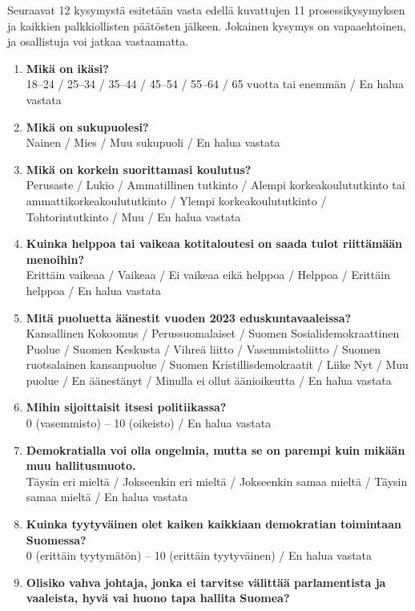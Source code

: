 Seuraavat 12 kysymystä esitetään vasta edellä kuvattujen 11 prosessikysymyksen ja kaikkien palkkiollisten päätösten jälkeen. Jokainen kysymys on vapaaehtoinen, ja osallistuja voi jatkaa vastaamatta.
\begin{enumerate}
  \item \textbf{Mikä on ikäsi?}\\
  18--24 / 25--34 / 35--44 / 45--54 / 55--64 / 65 vuotta tai enemmän / En halua vastata
  \item \textbf{Mikä on sukupuolesi?}\\
  Nainen / Mies / Muu sukupuoli / En halua vastata
  \item \textbf{Mikä on korkein suorittamasi koulutus?}\\
  Perusaste / Lukio / Ammatillinen tutkinto / Alempi korkeakoulututkinto tai ammattikorkeakoulututkinto / Ylempi korkeakoulututkinto / Tohtorintutkinto / Muu / En halua vastata
  \item \textbf{Kuinka helppoa tai vaikeaa kotitaloutesi on saada tulot riittämään menoihin?}\\
  Erittäin vaikeaa / Vaikeaa / Ei vaikeaa eikä helppoa / Helppoa / Erittäin helppoa / En halua vastata
  \item \textbf{Mitä puoluetta äänestit vuoden 2023 eduskuntavaaleissa?}\\
  Kansallinen Kokoomus / Perussuomalaiset / Suomen Sosialidemokraattinen Puolue / Suomen Keskusta / Vihreä liitto / Vasemmistoliitto / Suomen ruotsalainen kansanpuolue / Suomen Kristillisdemokraatit / Liike Nyt / Muu puolue / En äänestänyt / Minulla ei ollut äänioikeutta / En halua vastata
  \item \textbf{Mihin sijoittaisit itsesi politiikassa?}\\
  0 (vasemmisto) -- 10 (oikeisto) / En halua vastata
  \item \textbf{Demokratialla voi olla ongelmia, mutta se on parempi kuin mikään muu hallitusmuoto.}\\
  Täysin eri mieltä / Jokseenkin eri mieltä / Jokseenkin samaa mieltä / Täysin samaa mieltä / En halua vastata
  \item \textbf{Kuinka tyytyväinen olet kaiken kaikkiaan demokratian toimintaan Suomessa?}\\
  0 (erittäin tyytymätön) -- 10 (erittäin tyytyväinen) / En halua vastata
  \item \textbf{Olisiko vahva johtaja, jonka ei tarvitse välittää parlamentista ja vaaleista, hyvä vai huono tapa hallita Suomea?}\\

\end{enumerate}
